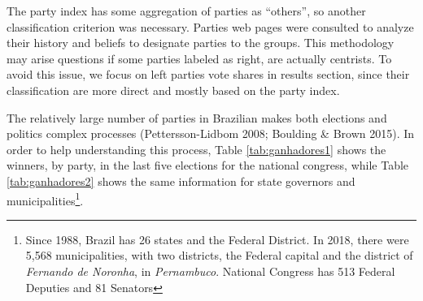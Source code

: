 \documentclass[
  12pt,
]{article}
\begin{document}
The party index has some aggregation of parties as ``others'', so
another classification criterion was necessary. Parties web pages were
consulted to analyze their history and beliefs to designate parties to
the groups. This methodology may arise questions if some parties labeled
as right, are actually centrists. To avoid this issue, we focus on left
parties vote shares in results section, since their classification are
more direct and mostly based on the party index.

The relatively large number of parties in Brazilian makes both elections
and politics complex processes (Pettersson-Lidbom 2008; Boulding \&
Brown 2015). In order to help understanding this process, Table
\ref{tab:ganhadores1} shows the winners, by party, in the last five
elections for the national congress, while Table \ref{tab:ganhadores2}
shows the same information for state governors and
municipalities\footnote{Since 1988, Brazil has 26 states and the Federal
  District. In 2018, there were 5,568 municipalities, with two
  districts, the Federal capital and the district of \emph{Fernando de
  Noronha}, in \emph{Pernambuco}. National Congress has 513 Federal
  Deputies and 81 Senators}.
\end{document}
